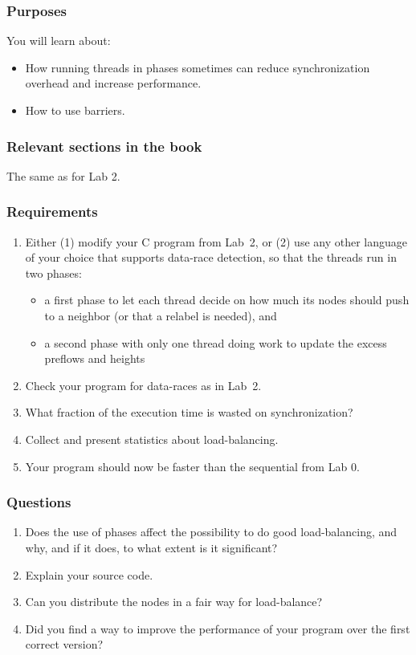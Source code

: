 \documentclass{forsete}
\begin{document}
\subsubsection*{Purposes}
You will learn about:
\begin{itemize}
\item How running threads in phases sometimes can reduce synchronization overhead and increase performance.
\item How to use barriers.
\end{itemize}

\subsubsection*{Relevant sections in the book}
The same as for Lab 2.
\subsubsection*{Requirements}
\begin{enumerate}
\item Either (1) modify your C program from Lab~2, or (2) use any other language of your choice that
supports data-race detection, so that the threads run in two phases:
\begin{itemize}
\item a first phase to let each thread decide on how much its nodes should push to a neighbor (or that a relabel is needed), and
\item a second phase with only one thread doing work to update the excess preflows and heights
\end{itemize}
\item Check your program for data-races as in Lab~2.

\item What fraction of the execution time is wasted on synchronization?

\item Collect and present statistics about load-balancing.
\item Your program should now be faster than the sequential from Lab 0.
\end{enumerate}

\subsubsection*{Questions}
\begin{enumerate}
\item Does the use of phases affect the possibility to do good load-balancing, and why, and if it does, to 
what extent is it significant?
\item Explain your source code.
\item Can you distribute the nodes in a fair way for load-balance?
\item Did you find a way to improve the performance of your program over the first correct version?

\end{enumerate}
\end{document}
